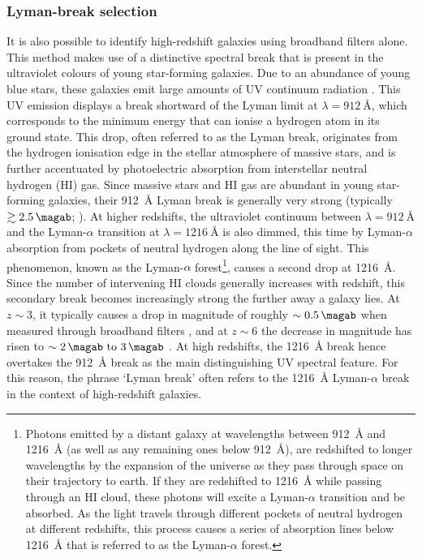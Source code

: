  


\subsubsection{Lyman-break selection}\label{subsubsection:lyman_break}
It is also possible to identify high-redshift galaxies using broadband filters alone. This method makes use of a distinctive spectral break that is present in the ultraviolet colours of young star-forming galaxies. Due to an abundance of young blue stars, these galaxies emit large amounts of UV continuum radiation \citep{1998ApJ...498..106M}. This UV emission displays a break shortward of the Lyman limit at $\lambda=\SI{912}{\angstrom}$, which corresponds to the minimum energy that can ionise a hydrogen atom in its ground state. This drop, often referred to as the Lyman break, originates from the hydrogen ionisation edge in the stellar atmosphere of massive stars, and is further accentuated by photoelectric absorption from interstellar neutral hydrogen (HI) gas. Since massive stars and HI gas are abundant in young star-forming galaxies, their \SI{912}{\angstrom} Lyman break is generally very strong (typically $\gtrsim \SI{2.5}{\magab}$; \citealt{1995ApJ...454L..19L}). At higher redshifts, the ultraviolet continuum between $\lambda=\SI{912}{\angstrom}$ and the Lyman-$\alpha$ transition at $\lambda=\SI{1216}{\angstrom}$ is also dimmed, this time by Lyman-$\alpha$ absorption from pockets of neutral hydrogen along the line of sight. This phenomenon, known as the Lyman-$\alpha$ forest\footnote{Photons emitted by a distant galaxy at wavelengths between \SI{912}{\angstrom} and \SI{1216}{\angstrom} (as well as any remaining ones below \SI{912}{\angstrom}), are redshifted to longer wavelengths by the expansion of the universe as they pass through space on their trajectory to earth. If they are redshifted to \SI{1216}{\angstrom} while passing through an HI cloud, these photons will excite a Lyman-$\alpha$ transition and be absorbed. As the light travels through different pockets of neutral hydrogen at different redshifts, this process causes a series of absorption lines below \SI{1216}{\angstrom} that is referred to as the Lyman-$\alpha$ forest.}, causes a second drop at \SI{1216}{\angstrom}. Since the number of intervening HI clouds generally increases with redshift, this secondary break becomes increasingly strong the further away a galaxy lies. At $z\sim3$, it typically causes a drop in magnitude of roughly $\sim \SI{0.5}{\magab}$ when measured through broadband filters \citep{1995ApJ...441...18M,2004AJ....127.2598S}, and at $z\sim6$ the decrease in magnitude has risen to $\sim\SIrange{2}{3}{\magab}$ \citep{2004AJ....127.2598S}. At high redshifts, the \SI{1216}{\angstrom} break hence overtakes the \SI{912}{\angstrom} break as the main distinguishing UV spectral feature. For this reason, the phrase `Lyman break' often refers to the \SI{1216}{\angstrom} Lyman-$\alpha$ break in the context of high-redshift galaxies. \par 

